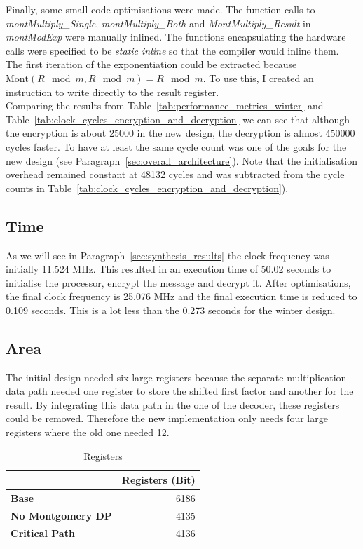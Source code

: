 \documentclass[a4paper]{article}
\begin{document}
Finally, some small code optimisations were made. The function calls to \textit{montMultiply\_Single}, \textit{montMultiply\_Both} and \textit{MontMultiply\_Result} in \textit{montModExp} were manually inlined. The functions encapsulating the hardware calls were specified to be \textit{static inline} so that the compiler would inline them. The first iteration of the exponentiation could be extracted because $\text{Mont}(R\mod{m}, R\mod{m}) = R\mod{m}$. To use this, I created an instruction to write directly to the result register.\\

Comparing the results from Table~\ref{tab:performance_metrics_winter} and Table~\ref{tab:clock_cycles_encryption_and_decryption} we can see that although the encryption is about 25000 in the new design, the decryption is almost 450000 cycles faster. To have at least the same cycle count was one of the goals for the new design (see Paragraph~\ref{sec:overall_architecture}). Note that the initialisation overhead remained constant at 48132 cycles and was subtracted from the cycle counts in Table~\ref{tab:clock_cycles_encryption_and_decryption}).

\subsection{Time}

As we will see in Paragraph~\ref{sec:synthesis_results} the clock frequency was initially 11.524 MHz. This resulted in an execution time of 50.02 seconds to initialise the processor, encrypt the message and decrypt it. After optimisations, the final clock frequency is 25.076 MHz and the final execution time is reduced to 0.109 seconds. This is a lot less than the 0.273 seconds for the winter design.

\subsection{Area}

The initial design needed six large registers because the separate multiplication data path needed one register to store the shifted first factor and another for the result. By integrating this data path in the one of the decoder, these registers could be removed. Therefore the new implementation only needs four large registers where the old one needed 12.\\

\begin{table}[H]
	\begin{center}	
		\begin{tabular}{l|r}
			& \textbf{Registers} (Bit)\\\hline
        		\textbf{Base} & 6186\\
             \textbf{No Montgomery DP} & 4135\\
             \textbf{Critical Path} & 4136
		\end{tabular}
	\end{center}
	\caption{Registers}
	\label{tab:registers}
\end{table}
\end{document}
